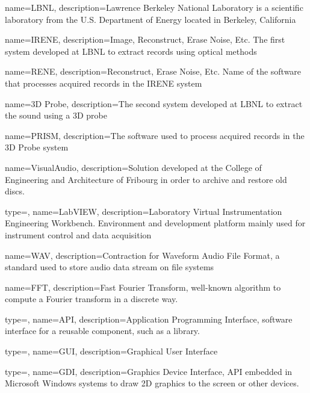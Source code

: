 %

{
    name=LBNL,
    description={Lawrence Berkeley National Laboratory is a scientific laboratory from the U.S. Department of Energy located in Berkeley, California}
}

{
    name=IRENE,
    description={Image, Reconstruct, Erase Noise, Etc. The first system developed at LBNL to extract records using optical methods}
}

{
    name=RENE,
    description={Reconstruct, Erase Noise, Etc. Name of the software that processes acquired records in the IRENE system}
}

{
    name=3D Probe,
    description={The second system developed at LBNL to extract the sound using a 3D probe}
}

{
    name=PRISM,
    description={The software used to process acquired records in the 3D Probe system}
}

{
    name=VisualAudio,
    description={Solution developed at the College of Engineering and Architecture of Fribourg in order to archive and restore old discs.}
}

{
    type=\acronymtype,
    name={LabVIEW},
    description={Laboratory Virtual Instrumentation Engineering Workbench. Environment and development platform mainly used for instrument control and data acquisition}
}

{
    name={WAV},
    description={Contraction for Waveform Audio File Format, a standard used to store audio data stream on file systems}
}

{
    name={FFT},
    description={Fast Fourier Transform, well-known algorithm to compute a Fourier transform in a discrete way.}
}

{
    type=\acronymtype,
    name={API},
    description={Application Programming Interface, software interface for a reusable component, such as a library.}
}

{
    type=\acronymtype,
    name={GUI},
    description={Graphical User Interface}
}

{
    type=\acronymtype,
    name={GDI},
    description={Graphics Device Interface, API embedded in Microsoft Windows systems to draw 2D graphics to the screen or other devices.}
}

